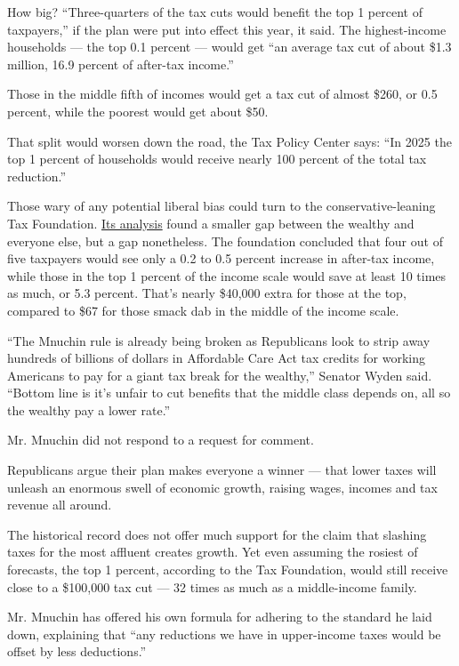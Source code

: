 How big? ``Three-quarters of the tax cuts would benefit the top 1
percent of taxpayers,'' if the plan were put into effect this year, it
said. The highest-income households --- the top 0.1 percent --- would
get ``an average tax cut of about \$1.3 million, 16.9 percent of
after-tax income.''

Those in the middle fifth of incomes would get a tax cut of almost
\$260, or 0.5 percent, while the poorest would get about \$50.

That split would worsen down the road, the Tax Policy Center says: ``In
2025 the top 1 percent of households would receive nearly 100 percent of
the total tax reduction.''

Those wary of any potential liberal bias could turn to the
conservative-leaning Tax Foundation.
\href{https://taxfoundation.org/details-and-analysis-2016-house-republican-tax-reform-plan/}{Its
analysis} found a smaller gap between the wealthy and everyone else, but
a gap nonetheless. The foundation concluded that four out of five
taxpayers would see only a 0.2 to 0.5 percent increase in after-tax
income, while those in the top 1 percent of the income scale would save
at least 10 times as much, or 5.3 percent. That's nearly \$40,000 extra
for those at the top, compared to \$67 for those smack dab in the middle
of the income scale.

``The Mnuchin rule is already being broken as Republicans look to strip
away hundreds of billions of dollars in Affordable Care Act tax credits
for working Americans to pay for a giant tax break for the wealthy,''
Senator Wyden said. ``Bottom line is it's unfair to cut benefits that
the middle class depends on, all so the wealthy pay a lower rate.''

Mr. Mnuchin did not respond to a request for comment.

Republicans argue their plan makes everyone a winner --- that lower
taxes will unleash an enormous swell of economic growth, raising wages,
incomes and tax revenue all around.

The historical record does not offer much support for the claim that
slashing taxes for the most affluent creates growth. Yet even assuming
the rosiest of forecasts, the top 1 percent, according to the Tax
Foundation, would still receive close to a \$100,000 tax cut --- 32
times as much as a middle-income family.

Mr. Mnuchin has offered his own formula for adhering to the standard he
laid down, explaining that ``any reductions we have in upper-income
taxes would be offset by less deductions.''

